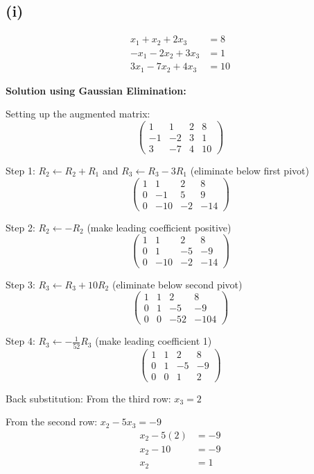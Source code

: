 \subsection*{(i)}
\begin{align*}
x_1 + x_2 + 2x_3 &= 8\\
-x_1 - 2x_2 + 3x_3 &= 1\\
3x_1 - 7x_2 + 4x_3 &= 10
\end{align*}

\textbf{Solution using Gaussian Elimination:}

Setting up the augmented matrix:
\[
\left(\begin{array}{ccc|c}
1 & 1 & 2 & 8\\
-1 & -2 & 3 & 1\\
3 & -7 & 4 & 10
\end{array}\right)
\]

Step 1: $R_2 \leftarrow R_2 + R_1$ and $R_3 \leftarrow R_3 - 3R_1$ (eliminate below first pivot)
\[
\left(\begin{array}{ccc|c}
1 & 1 & 2 & 8\\
0 & -1 & 5 & 9\\
0 & -10 & -2 & -14
\end{array}\right)
\]

Step 2: $R_2 \leftarrow -R_2$ (make leading coefficient positive)
\[
\left(\begin{array}{ccc|c}
1 & 1 & 2 & 8\\
0 & 1 & -5 & -9\\
0 & -10 & -2 & -14
\end{array}\right)
\]

Step 3: $R_3 \leftarrow R_3 + 10R_2$ (eliminate below second pivot)
\[
\left(\begin{array}{ccc|c}
1 & 1 & 2 & 8\\
0 & 1 & -5 & -9\\
0 & 0 & -52 & -104
\end{array}\right)
\]

Step 4: $R_3 \leftarrow -\frac{1}{52}R_3$ (make leading coefficient 1)
\[
\left(\begin{array}{ccc|c}
1 & 1 & 2 & 8\\
0 & 1 & -5 & -9\\
0 & 0 & 1 & 2
\end{array}\right)
\]

Back substitution:
From the third row: $x_3 = 2$

From the second row: $x_2 - 5x_3 = -9$
\begin{align*}
x_2 - 5(2) &= -9\\
x_2 - 10 &= -9\\
x_2 &= 1
\end{align*}

